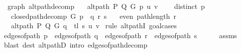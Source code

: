 \begin{isabellebody}
{\isafoldproof}%
%
\isadelimproof
\isanewline
%
\endisadelimproof
%
\isadeliminvisible
\isanewline
%
\endisadeliminvisible
%
\isataginvisible
{}\isamarkupfalse%
\ {\isacharparenleft}{\kern0pt}\ graph{\isacharparenright}{\kern0pt}\ alt{\isacharunderscore}{\kern0pt}path{\isacharunderscore}{\kern0pt}decomp{\isacharcolon}{\kern0pt}\isanewline
\ \ \ {\isachardoublequoteopen}alt{\isacharunderscore}{\kern0pt}path\ P\ Q\ G\ p\ u\ v{\isachardoublequoteclose}\isanewline
\ \ \ {\isachardoublequoteopen}{\isasymnot}\ distinct\ p{\isachardoublequoteclose}\isanewline
\ \ \ {\isachardoublequoteopen}closed{\isacharunderscore}{\kern0pt}path{\isacharunderscore}{\kern0pt}decomp\ G\ p\ {\isacharequal}{\kern0pt}\ {\isacharparenleft}{\kern0pt}q{\isacharcomma}{\kern0pt}\ r{\isacharcomma}{\kern0pt}\ s{\isacharparenright}{\kern0pt}{\isachardoublequoteclose}\isanewline
\ \ \ {\isachardoublequoteopen}even\ {\isacharparenleft}{\kern0pt}path{\isacharunderscore}{\kern0pt}length\ r{\isacharparenright}{\kern0pt}{\isachardoublequoteclose}\isanewline
\ \ \ {\isachardoublequoteopen}alt{\isacharunderscore}{\kern0pt}path\ P\ Q\ G\ {\isacharparenleft}{\kern0pt}q\ {\isacharat}{\kern0pt}\ tl\ s{\isacharparenright}{\kern0pt}\ u\ v{\isachardoublequoteclose}%
\endisataginvisible
{\isafoldinvisible}%
%
\isadeliminvisible
\isanewline
%
\endisadeliminvisible
%
\isadelimproof
%
\endisadelimproof
%
\isatagproof
{}\isamarkupfalse%
\ {\isacharparenleft}{\kern0pt}rule\ alt{\isacharunderscore}{\kern0pt}pathI{\isacharcomma}{\kern0pt}\ goal{\isacharunderscore}{\kern0pt}cases{\isacharparenright}{\kern0pt}\isanewline
\ \ \isamarkupfalse%
\ {}\isanewline
\ \ \isamarkupfalse%
\ {\isachardoublequoteopen}edges{\isacharunderscore}{\kern0pt}of{\isacharunderscore}{\kern0pt}path\ p\ {\isacharequal}{\kern0pt}\ edges{\isacharunderscore}{\kern0pt}of{\isacharunderscore}{\kern0pt}path\ q\ {\isacharat}{\kern0pt}\ edges{\isacharunderscore}{\kern0pt}of{\isacharunderscore}{\kern0pt}path\ r\ {\isacharat}{\kern0pt}\ edges{\isacharunderscore}{\kern0pt}of{\isacharunderscore}{\kern0pt}path\ s{\isachardoublequoteclose}\isanewline
\ \ \ \ \isamarkupfalse%
\ assms{\isacharparenleft}{\kern0pt}{}{\isacharminus}{\kern0pt}{}{\isacharparenright}{\kern0pt}\isanewline
\ \ \ \ \isamarkupfalse%
\ {\isacharparenleft}{\kern0pt}blast\ dest{\isacharcolon}{\kern0pt}\ alt{\isacharunderscore}{\kern0pt}pathD{\isacharparenleft}{\kern0pt}{}{\isacharparenright}{\kern0pt}\ intro{\isacharcolon}{\kern0pt}\ edges{\isacharunderscore}{\kern0pt}of{\isacharunderscore}{\kern0pt}path{\isacharunderscore}{\kern0pt}decomp{\isacharparenright}{\kern0pt}\isanewline

\end{isabellebody}
